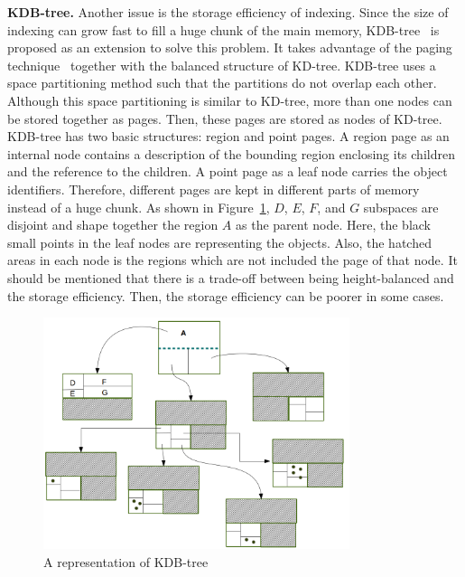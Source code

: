 \documentclass[a4paper,12pt]{article}
\begin{document}
\textbf{KDB-tree.} Another issue is the storage efficiency of indexing.
Since the size of indexing can grow fast to fill a huge chunk of the main memory, 
KDB-tree~\cite{kdbtree} is proposed as an extension to solve this problem. 
It takes advantage of the paging technique~\cite{bintreepaging} together with the balanced structure of KD-tree. 
KDB-tree uses a space partitioning method such that the partitions do not overlap each other.
Although this space partitioning is similar to KD-tree, more than one nodes can be stored together as pages. 
Then, these pages are stored as nodes of KD-tree.
KDB-tree has two basic structures: region and point pages. A region page as an internal node contains a description of the bounding region enclosing its children and the reference to the children. 
A point page as a leaf node carries the object identifiers. Therefore, different pages are kept in different parts of memory instead of a huge chunk. 
As shown in Figure~\ref{figkdbtree}, $D$, $E$, $F$, and $G$ subspaces are disjoint and shape together the region $A$ as the parent node. Here, the black small points in the leaf nodes are representing the objects. Also, the hatched areas in each node is the regions which are not included the page of that node. 
It should be mentioned that there is a trade-off between being height-balanced and the storage efficiency.
Then, the storage efficiency can be poorer in some cases. 

\begin{figure}
\centering
\includegraphics[width=0.8\textwidth]{kdbtree}
\caption{A representation of KDB-tree}
\label{figkdbtree}
\end{figure}
\end{document}
